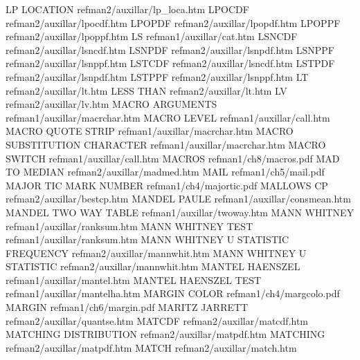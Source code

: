 LP LOCATION                             refman2/auxillar/lp_loca.htm
LPOCDF                                  refman2/auxillar/lpocdf.htm
LPOPDF                                  refman2/auxillar/lpopdf.htm
LPOPPF                                  refman2/auxillar/lpoppf.htm
LS                                      refman1/auxillar/cat.htm
LSNCDF                                  refman2/auxillar/lsncdf.htm
LSNPDF                                  refman2/auxillar/lsnpdf.htm
LSNPPF                                  refman2/auxillar/lsnppf.htm
LSTCDF                                  refman2/auxillar/lsncdf.htm
LSTPDF                                  refman2/auxillar/lsnpdf.htm
LSTPPF                                  refman2/auxillar/lsnppf.htm
LT                                      refman2/auxillar/lt.htm
LESS THAN                               refman2/auxillar/lt.htm
LV                                      refman2/auxillar/lv.htm
MACRO ARGUMENTS                         refman1/auxillar/macrchar.htm
MACRO LEVEL                             refman1/auxillar/call.htm
MACRO QUOTE STRIP                       refman1/auxillar/macrchar.htm
MACRO SUBSTITUTION CHARACTER            refman1/auxillar/macrchar.htm
MACRO SWITCH                            refman1/auxillar/call.htm
MACROS                                  refman1/ch8/macros.pdf
MAD TO MEDIAN                           refman2/auxillar/madmed.htm
MAIL                                    refman1/ch5/mail.pdf
MAJOR TIC MARK NUMBER                   refman1/ch4/majortic.pdf
MALLOWS CP                              refman2/auxillar/bestcp.htm
MANDEL PAULE                            refman1/auxillar/consmean.htm
MANDEL TWO WAY TABLE                    refman1/auxillar/twoway.htm
MANN WHITNEY                            refman1/auxillar/ranksum.htm
MANN WHITNEY TEST                       refman1/auxillar/ranksum.htm
MANN WHITNEY U STATISTIC FREQUENCY      refman2/auxillar/mannwhit.htm
MANN WHITNEY U STATISTIC                refman2/auxillar/mannwhit.htm
MANTEL HAENSZEL                         refman1/auxillar/mantel.htm
MANTEL HAENSZEL TEST                    refman1/auxillar/mantelha.htm
MARGIN COLOR                            refman1/ch4/margcolo.pdf
MARGIN                                  refman1/ch6/margin.pdf
MARITZ JARRETT                          refman2/auxillar/quantse.htm
MATCDF                                  refman2/auxillar/matcdf.htm
MATCHING DISTRIBUTION                   refman2/auxillar/matpdf.htm
MATCHING                                refman2/auxillar/matpdf.htm
MATCH                                   refman2/auxillar/match.htm
